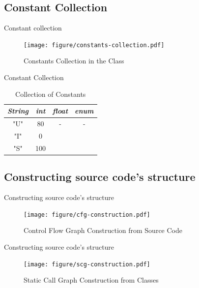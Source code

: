 \documentclass{beamer}
\begin{document}
\subsection{Constant Collection}
\begin{frame}{Constant collection}
    \begin{figure}
        \texttt{[image: figure/constants-collection.pdf]}
        \caption{Constants Collection in the Class}
        \label{fig:constantsCollection}
    \end{figure}
\end{frame}

\begin{frame}{Constant Collection}
    \begin{table}
        \caption{Collection of Constants}
        \label{tab:fff}
        \begin{tabular}{cccc}
            \textit{\textbf{String}} & \textit{\textbf{int}} & \textit{\textbf{float}} & \textit{\textbf{enum}} \\ \hline \hline
            "U"     & 80    & - & - \\
            "I"     & 0     &   &   \\
            "S"     & 100   &   &   \\ \hline 
        \end{tabular}
    \end{table}
\end{frame}

\subsection{Constructing source code's structure}
\begin{frame}{Constructing source code's structure}
    \begin{figure}
        \texttt{[image: figure/cfg-construction.pdf]}
        \caption{Control Flow Graph Construction from Source Code}
        \label{fig:cfgConstruct}
    \end{figure}
\end{frame}

\begin{frame}{Constructing source code's structure}
    \begin{figure}
        \texttt{[image: figure/scg-construction.pdf]}
        \caption{Static Call Graph Construction from Classes}
        \label{fig:scgConstruct}
    \end{figure}
\end{frame}
\end{document}
